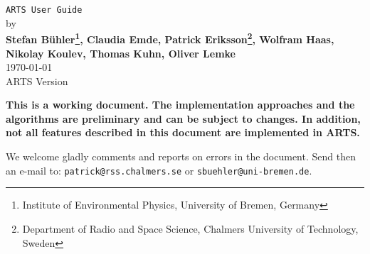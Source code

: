 %
%
\newcommand{\artsstyle}[1]      {\texttt{#1}}



%
%
\newcommand{\textindex}[1]   {#1\index{#1}}  
%
\newcommand{\wsmindex}[1]    {\artsstyle{#1}\index{workspace methods!#1}}  
%
\newcommand{\wsvindex}[1]    {\artsstyle{#1}\index{workspace variables!#1}}
%
\newcommand{\wsaindex}[1]    {\artsstyle{#1}\index{workspace agendas!#1}}  
%
\newcommand{\fileindex}[1]   {\artsstyle{#1}\index{ARTS files!#1}}
%
\newcommand{\funcindex}[1]   {\artsstyle{#1}\index{internal ARTS functions!#1}}
%
\newcommand{\typeindex}[1] {\artsstyle{#1}\index{data types!#1}}










%
%
\thispagestyle{plain}
\begin{center}
  \vspace*{2cm}
  {\Huge \verb|ARTS User Guide|\\}
  \vspace*{1cm}
  {\large by \\}
  \vspace*{1cm}
  {\large \bf Stefan B\"uhler\footnote{Institute of Environmental
      Physics, University of Bremen, Germany},  Claudia
    Emde\footnotemark[1], Patrick Eriksson\footnote{Department of
    Radio and Space Science, Chalmers University of Technology, Sweden}, 
    Wolfram Haas, Nikolay Koulev\footnotemark[1],
    Thomas Kuhn\footnotemark[1], Oliver Lemke\footnotemark[1]}\\
   \vspace*{2cm}
   {\large \today\\
    ARTS Version 
   }
\end{center}
  \vspace*{4cm}
{\normalsize \bf
  \noindent
  This is a working document. The implementation approaches and the
  algorithms are preliminary and can be subject to changes. In addition,
  not all features described in this document are implemented in ARTS.
  
  We welcome gladly comments and reports on errors in the document.
  Send then an e-mail to: \verb|patrick@rss.chalmers.se| or 
  \verb|sbuehler@uni-bremen.de|.
}

